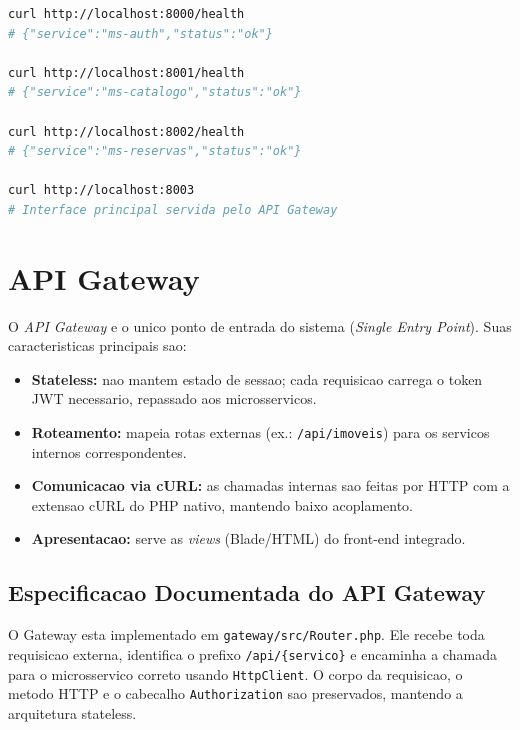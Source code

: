 \documentclass[12pt,a4paper]{article}
\begin{document}
\begin{lstlisting}[language=bash,caption={Verificacao dos microsservicos em execucao e suas portas.}]
curl http://localhost:8000/health
# {"service":"ms-auth","status":"ok"}

curl http://localhost:8001/health
# {"service":"ms-catalogo","status":"ok"}

curl http://localhost:8002/health
# {"service":"ms-reservas","status":"ok"}

curl http://localhost:8003
# Interface principal servida pelo API Gateway
\end{lstlisting}

\section{API Gateway}
O \textit{API Gateway} e o unico ponto de entrada do sistema (\textit{Single Entry
Point}). Suas caracteristicas principais sao:

\begin{itemize}
    \item \textbf{Stateless:} nao mantem estado de sessao; cada requisicao carrega o
    token JWT necessario, repassado aos microsservicos.
    \item \textbf{Roteamento:} mapeia rotas externas (ex.: \texttt{/api/imoveis}) para
    os servicos internos correspondentes.
    \item \textbf{Comunicacao via cURL:} as chamadas internas sao feitas por HTTP com a
    extensao cURL do PHP nativo, mantendo baixo acoplamento.
    \item \textbf{Apresentacao:} serve as \textit{views} (Blade/HTML) do front-end
    integrado.
\end{itemize}

\subsection{Especificacao Documentada do API Gateway}
O Gateway esta implementado em \texttt{gateway/src/Router.php}. Ele recebe toda
requisicao externa, identifica o prefixo \texttt{/api/\{servico\}} e encaminha a
chamada para o microsservico correto usando \texttt{HttpClient}. O corpo da requisicao,
o metodo HTTP e o cabecalho \texttt{Authorization} sao preservados, mantendo a
arquitetura stateless.
\end{document}
